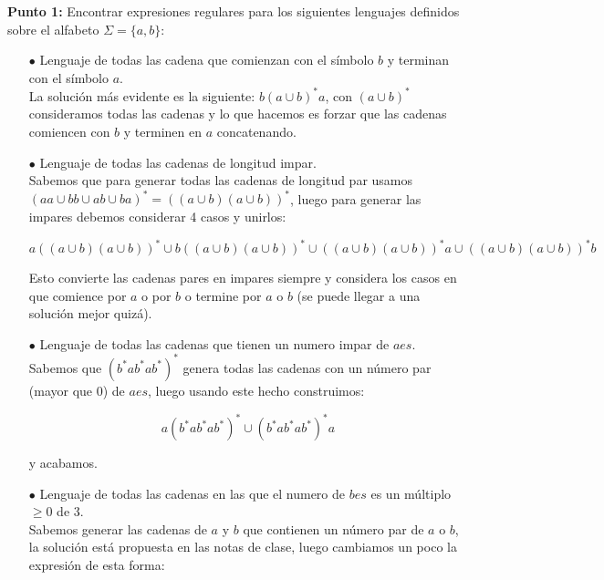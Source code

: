 
\textbf{Punto 1: }Encontrar expresiones regulares para los siguientes lenguajes definidos sobre el alfabeto $\Sigma=\{a,b\}:$

\begin{itemize}

    \item[$\bullet$] Lenguaje de todas las cadena que comienzan con el símbolo $b$ y terminan con el símbolo $a$.\\ 

    La solución más evidente es la siguiente: $b(a\cup b)^*a$, con $(a\cup b)^*$ consideramos todas las cadenas y lo que hacemos es forzar que las cadenas comiencen con $b$ y terminen en $a$ concatenando.

    \item[$\bullet$]Lenguaje de todas las cadenas de longitud impar.\\

     Sabemos que para generar todas las cadenas de longitud par usamos $(aa\cup bb\cup ab\cup ba)^*=((a\cup b)(a\cup b))^*$, luego para generar las impares debemos considerar 4 casos y unirlos:

    $$a((a\cup b)(a\cup b))^*\cup b((a\cup b)(a\cup b))^* \cup ((a\cup b)(a\cup b))^*a \cup ((a\cup b)(a\cup b))^*b$$

    Esto convierte las cadenas pares en impares siempre y considera los casos en que comience por $a$ o por $b$ o termine por $a$ o $b$ (se puede llegar a una solución mejor quizá).

    \item[$\bullet$] Lenguaje de todas las cadenas que tienen un numero impar de $aes.$\\ 

    Sabemos que $(b^*ab^*ab^*)^*$ genera todas las cadenas con un número par (mayor que 0) de $aes$, luego usando este hecho construimos:

    $$a(b^*ab^*ab^*)^*\cup (b^*ab^*ab^*)^*a$$

    y acabamos.

    \item[$\bullet$]Lenguaje de todas las cadenas en las que el numero de $bes$ es un múltiplo $\geq0$ de 3.\\ 

    Sabemos generar las cadenas de $a$ y $b$ que contienen un número par de $a$ o $b$, la solución está propuesta en las notas de clase, luego cambiamos un poco la expresión de esta forma:


\end{itemize}
